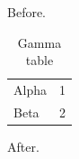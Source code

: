 \documentclass{beamer}
\begin{document}
\begin{frame}[plain,t]
Before.\begin{table}\begin{tabular}{lr}Alpha&1\\Beta&2\end{tabular}\caption{Gamma table}\end{table}After.
\end{frame}
\end{document}
